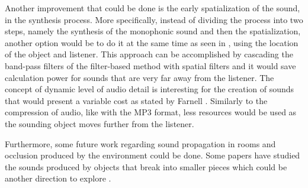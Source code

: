 Another improvement that could be done is the early spatialization of the sound, in the synthesis process. More specifically, instead of dividing the process into two steps, namely the synthesis of the monophonic sound and then the spatialization, another option would be to do it at the same time as seen in \cite{verron2010synthese}, using the location of the object and listener. This approach can be accomplished by cascading the band-pass filters of the filter-based method with spatial filters and it would save calculation power for sounds that are very far away from the listener. The concept of dynamic level of audio detail is interesting for the creation of sounds that would present a variable cost as stated by Farnell \cite{farnell2010designing}. Similarly to the compression of audio, like with the MP3 format, less resources would be used as the sounding object moves further from the listener. 

Furthermore, some future work regarding sound propagation in rooms and occlusion produced by the environment could be done. Some papers have studied the sounds produced by objects that break into smaller pieces which could be another direction to explore \cite{zheng2010rigid}.


